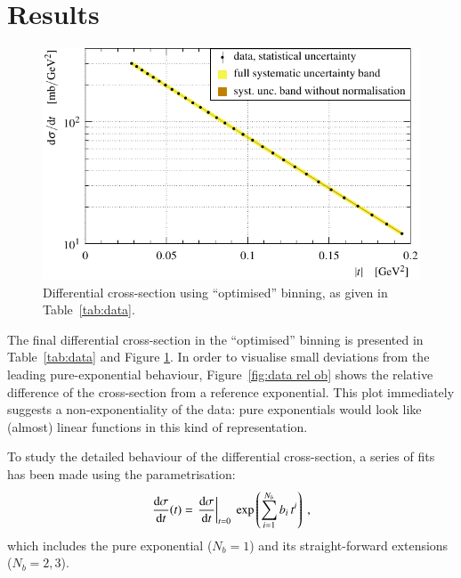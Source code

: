 \section{Results}
\label{sec:results}


\begin{figure}
\begin{center}
\includegraphics{fig/t_dist.pdf}
\caption{%
Differential cross-section using ``optimised'' binning, as given in Table~\ref{tab:data}.
}
\label{fig:data ob}
\end{center}
\end{figure}


The final differential cross-section in the ``optimised'' binning is presented in Table~\ref{tab:data} and Figure \ref{fig:data ob}. In order to visualise small deviations from the leading pure-exponential behaviour, Figure~\ref{fig:data rel ob} shows the relative difference of the cross-section from a reference exponential. This plot immediately suggests a non-exponentiality of the data: pure exponentials would look like (almost) linear functions in this kind of representation.

To study the detailed behaviour of the differential cross-section, a series of fits has been made using the parametrisation:
\begin{equation}
\label{eq:fit param}
{\d\sigma\over\d t}(t) = \left. \d\sigma\over\d t\right|_{t=0} \ \exp\left( \sum\limits_{i = 1}^{N_{b}} b_i\, t^i \right) \ ,
\end{equation}
which includes the pure exponential ($N_b = 1$) and its straight-forward extensions ($N_b = 2, 3$).

